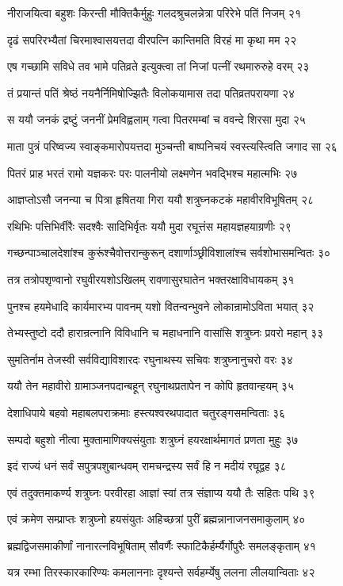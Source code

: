नीराजयित्वा बहुशः किरन्ती मौक्तिकैर्मुहुः
गलदश्रुचलन्नेत्रा परिरेभे पतिं निजम् २१

दृढं सपरिरभ्यैतां चिरमाश्वासयत्तदा
वीरपत्नि कान्तिमति विरहं मा कृथा मम २२

एष गच्छामि सविधे तव भामे पतिव्रते
इत्युक्त्वा तां निजां पत्नीं रथमारुरुहे वरम् २३

तं प्रयान्तं पतिं श्रेष्ठं नयनैर्निमिषोज्झितैः
विलोकयामास तदा पतिव्रतपरायणा २४

स ययौ जनकं द्रष्टुं जननीं प्रेमविह्वलाम्
गत्वा पितरमम्बां च ववन्दे शिरसा मुदा २५

माता पुत्रं परिष्वज्य स्वाङ्कमारोपयत्तदा
मुञ्चन्ती बाष्पनिचयं स्वस्त्यस्त्विति जगाद सा २६

पितरं प्राह भरतं रामो यज्ञकरः परः
पालनीयो लक्ष्मणेन भवद्भिश्च महात्मभिः २७

आज्ञप्तोऽसौ जनन्या च पित्रा हृषितया गिरा
ययौ शत्रुघ्नकटकं महावीरविभूषितम् २८

रथिभिः पत्तिभिर्वीरैः सदश्वैः सादिभिर्वृतः
ययौ मुदा रघूत्तंस महायज्ञहयाग्रणीः २९

गच्छन्पाञ्चालदेशांश्च कुरूंश्चैवोत्तरान्कुरून्
दशार्णाञ्छ्रीविशालांश्च सर्वशोभासमन्वितः ३०

तत्र तत्रोपशृण्वानो रघुवीरयशोऽखिलम्
रावणासुरघातेन भक्तरक्षाविधायकम् ३१

पुनश्च हयमेधादि कार्यमारभ्य पावनम्
यशो वितन्वन्भुवने लोकान्रामोऽविता भयात् ३२

तेभ्यस्तुष्टो ददौ हारान्रत्नानि विविधानि च
महाधनानि वासांसि शत्रुघ्नः प्रवरो महान् ३३

सुमतिर्नाम तेजस्वी सर्वविद्याविशारदः
रघुनाथस्य सचिवः शत्रुघ्नानुचरो वरः ३४

ययौ तेन महावीरो ग्रामाञ्जनपदान्बहून्
रघुनाथप्रतापेन न कोपि हृतवान्हयम् ३५

देशाधिपाये बहवो महाबलपराक्रमाः
हस्त्यश्वरथपादात चतुरङ्गसमन्विताः ३६

सम्पदो बहुशो नीत्वा मुक्तामाणिक्यसंयुताः
शत्रुघ्नं हयरक्षार्थमागतं प्रणता मुहुः ३७

इदं राज्यं धनं सर्वं सपुत्रपशुबान्धवम्
रामचन्द्रस्य सर्वं हि न मदीयं रघूद्वह ३८

एवं तदुक्तमाकर्ण्य शत्रुघ्नः परवीरहा
आज्ञां स्वां तत्र संज्ञाप्य ययौ तैः सहितः पथि ३९

एवं क्रमेण सम्प्राप्तः शत्रुघ्नो हयसंयुतः
अहिच्छत्रां पुरीं ब्रह्मन्नानाजनसमाकुलाम् ४०

ब्रह्मद्विजसमाकीर्णां नानारत्नविभूषिताम्
सौवर्णैः स्फाटिकैर्हर्म्यैर्गोपुरैः समलङ्कृताम् ४१

यत्र रम्भा तिरस्कारकारिण्यः कमलाननाः
दृश्यन्ते सर्वहर्म्येषु ललना लीलयान्विताः ४२

